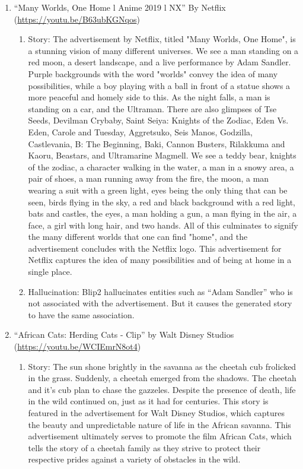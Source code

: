 \documentclass[hidelinks,11pt,a4paper]{report}
\begin{document}
\begin{enumerate}
    \item ``Many Worlds, One Home l Anime 2019 l NX'' By Netflix (\url{https://youtu.be/B63ubKGNqos}) 
    \begin{enumerate}
        \item Story: The advertisement by Netflix, titled "Many Worlds, One Home", is a stunning vision of many different universes. We see a man standing on a red moon, a desert landscape, and a live performance by Adam Sandler. Purple backgrounds with the word "worlds" convey the idea of many possibilities, while a boy playing with a ball in front of a statue shows a more peaceful and homely side to this. As the night falls, a man is standing on a car, and the Ultraman. There are also glimpses of Tse Seeds, Devilman Crybaby, Saint Seiya: Knights of the Zodiac, Eden Vs. Eden, Carole and Tuesday, Aggretsuko, Seis Manos, Godzilla, Castlevania, B: The Beginning, Baki, Cannon Busters, Rilakkuma and Kaoru, Beastars, and Ultramarine Magmell. We see a teddy bear, knights of the zodiac, a character walking in the water, a man in a snowy area, a pair of shoes, a man running away from the fire, the moon, a man wearing a suit with a green light, eyes being the only thing that can be seen, birds flying in the sky, a red and black background with a red light, bats and castles, the eyes, a man holding a gun, a man flying in the air, a face, a girl with long hair, and two hands. All of this culminates to signify the many different worlds that one can find "home", and the advertisement concludes with the Netflix logo. This advertisement for Netflix captures the idea of many possibilities and of being at home in a single place.
        
        \item Hallucination: Blip2 hallucinates entities such as ``Adam Sandler'' who is not associated with the advertisement. But it causes the generated story to have the same association.
    \end{enumerate}
    
    

    \item ``African Cats: Herding Cats - Clip'' by Walt Disney Studios (\url{https://youtu.be/WCIEmrN8ot4}) 
    \begin{enumerate}
        \item Story: The sun shone brightly in the savanna as the cheetah cub frolicked in the grass. Suddenly, a cheetah emerged from the shadows. The cheetah and it's cub plan to chase the gazzeles. Despite the presence of death, life in the wild continued on, just as it had for centuries. This story is featured in the advertisement for Walt Disney Studios, which captures the beauty and unpredictable nature of life in the African savanna. This advertisement ultimately serves to promote the film African Cats, which tells the story of a cheetah family as they strive to protect their respective prides against a variety of obstacles in the wild.
        

\end{enumerate}
\end{enumerate}
\end{document}
